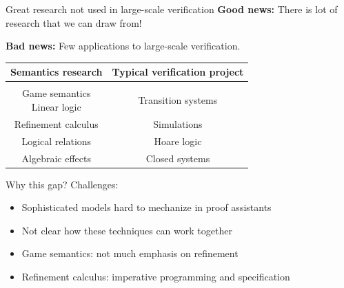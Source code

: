 \documentclass{beamer}
\begin{document}
\begin{frame}{Great research not used in large-scale verification} %
  \textbf{Good news:}
  There is lot of research that we can draw from!

  \textbf{Bad news:}
  Few applications to
  large-scale verification.

  \vfill
  \begin{center}
    \begin{tabular}{cc}
      \hline
      Semantics research &
      Typical verification project
      \\
      \hline
      \\[-1ex]
      \parbox{10em}{\centering Game semantics \\ Linear logic} &
      Transition systems \\[1em]
      Refinement calculus &
      Simulations \\[1em]
      Logical relations &
      Hoare logic \\[1em]
      Algebraic effects &
      Closed systems \\[1em]
      \hline
    \end{tabular}
  \end{center}
\end{frame}

\begin{frame}{Why this gap?} %
  Challenges:
  \begin{itemize}
    \item Sophisticated models hard to mechanize in proof assistants
    \item Not clear how these techniques can work together
    \item Game semantics: not much emphasis on refinement
    \item Refinement calculus: imperative programming and specification
  \end{itemize}
\end{frame}  
\end{document}
